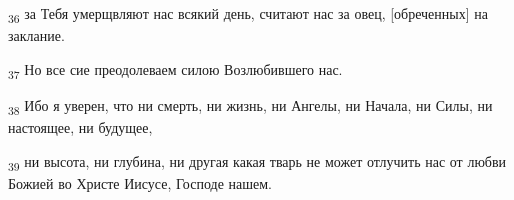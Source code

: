 \begin{tcolorbox}
\textsubscript{36} за Тебя умерщвляют нас всякий день, считают нас за овец, [обреченных] на заклание.
\end{tcolorbox}
\begin{tcolorbox}
\textsubscript{37} Но все сие преодолеваем силою Возлюбившего нас.
\end{tcolorbox}
\begin{tcolorbox}
\textsubscript{38} Ибо я уверен, что ни смерть, ни жизнь, ни Ангелы, ни Начала, ни Силы, ни настоящее, ни будущее,
\end{tcolorbox}
\begin{tcolorbox}
\textsubscript{39} ни высота, ни глубина, ни другая какая тварь не может отлучить нас от любви Божией во Христе Иисусе, Господе нашем.
\end{tcolorbox}
